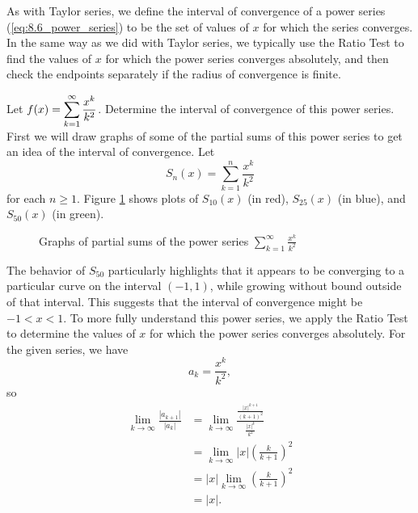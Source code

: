 As with Taylor series, we define the interval of convergence of a power series (\ref{eq:8.6_power_series}) to be the set of values of $x$ for which the series converges. In the same way as we did with Taylor series, we typically use the Ratio Test to find the values of $x$ for which the power series converges absolutely, and then check the endpoints separately if the radius of convergence is finite.

\bex \label{Ex:8.6.2} Let $f(x) = \displaystyle \sum_{k=1}^{\infty} \frac{x^k}{k^2}$. Determine the interval of convergence of this power series.
\eex
First we will draw graphs of some of the partial sums of this power series to get an idea of the interval of convergence. Let
\[S_n(x) = \sum_{k=1}^{n} \frac{x^k}{k^2}\]
for each $n \geq 1$. Figure \ref{F:8.6.Power_Series} shows plots of $S_{10}(x)$ (in red), $S_{25}(x)$ (in blue), and $S_{50}(x)$ (in green).
\begin{figure}[h]
\begin{center} 
\caption{Graphs of partial sums of the power series $\sum_{k=1}^{\infty} \frac{x^k}{k^2}$}
\label{F:8.6.Power_Series}
\end{center}
\end{figure}
The behavior of $S_{50}$ particularly highlights that it appears to be converging to a particular curve on the interval $(-1,1)$, while growing without bound outside of that interval. This suggests that the interval of convergence might be $-1 < x < 1$. To more fully understand this power series, we apply the Ratio Test to determine the values of $x$ for which the power series converges absolutely. For the given series, we have
\[a_k = \frac{x^k}{k^2},\]
so
\begin{align*}
\lim_{k \to \infty} \frac{\left| a_{k+1} \right|}{ \left| a_k \right|} &= \lim_{k \to \infty} \frac{ \frac{|x|^{k+1}}{(k+1)^2} }{ \frac{| x|^{k}}{k^2} } \\
    &= \lim_{k \to \infty} |x| \left(\frac{k}{k+1}\right)^2 \\
    &= |x| \lim_{k \to \infty}  \left(\frac{k}{k+1}\right)^2 \\
    &= |x|.
\end{align*}
